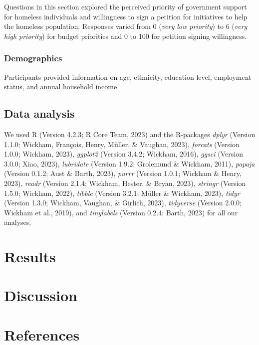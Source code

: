 \documentclass[
  man]{apa6}
\begin{document}
Questions in this section explored the perceived priority of government support for homeless individuals and willingness to sign a petition for initiatives to help the homeless population. Responses varied from 0 (\emph{very low priority}) to 6 (\emph{very high priority}) for budget priorities and 0 to 100 for petition signing willingness.

\hypertarget{demographics}{%
\subsubsection{Demographics}\label{demographics}}

Participants provided information on age, ethnicity, education level, employment status, and annual household income.

\hypertarget{data-analysis}{%
\subsection{Data analysis}\label{data-analysis}}

We used R (Version 4.2.3; R Core Team, 2023) and the R-packages \emph{dplyr} (Version 1.1.0; Wickham, François, Henry, Müller, \& Vaughan, 2023), \emph{forcats} (Version 1.0.0; Wickham, 2023), \emph{ggplot2} (Version 3.4.2; Wickham, 2016), \emph{ggsci} (Version 3.0.0; Xiao, 2023), \emph{lubridate} (Version 1.9.2; Grolemund \& Wickham, 2011), \emph{papaja} (Version 0.1.2; Aust \& Barth, 2023), \emph{purrr} (Version 1.0.1; Wickham \& Henry, 2023), \emph{readr} (Version 2.1.4; Wickham, Hester, \& Bryan, 2023), \emph{stringr} (Version 1.5.0; Wickham, 2022), \emph{tibble} (Version 3.2.1; Müller \& Wickham, 2023), \emph{tidyr} (Version 1.3.0; Wickham, Vaughan, \& Girlich, 2023), \emph{tidyverse} (Version 2.0.0; Wickham et al., 2019), and \emph{tinylabels} (Version 0.2.4; Barth, 2023) for all our analyses.

\hypertarget{results}{%
\section{Results}\label{results}}

\hypertarget{discussion}{%
\section{Discussion}\label{discussion}}

\newpage

\hypertarget{references}{%
\section{References}\label{references}}
\end{document}
